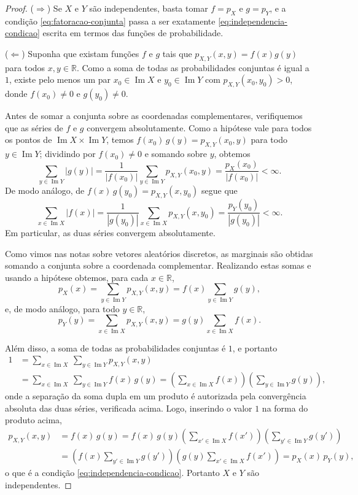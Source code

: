 \documentclass[12pt,portuguese]{article}
\theoremstyle{definition}
\begin{document}
\begin{proof}
\smallskip
\noindent($\Longrightarrow$) Se $X$ e $Y$ são independentes, basta tomar
$f = p_X$ e $g = p_Y$, e a condição \eqref{eq:fatoracao-conjunta} passa a ser
exatamente \eqref{eq:independencia-condicao} escrita em termos das funções de
probabilidade.

\smallskip
\noindent($\Longleftarrow$) Suponha que existam funções $f$ e $g$ tais
que $p_{X,Y}(x,y) = f(x)g(y)$ para todos $x, y \in \mathbb{R}$. Como a soma de
todas as probabilidades conjuntas é igual a $1$, existe pelo menos um par
$x_0 \in \operatorname{Im}X$ e $y_0 \in \operatorname{Im}Y$ com
$p_{X,Y}(x_0,y_0) > 0$, donde $f(x_0) \neq 0$ e $g(y_0) \neq 0$.

Antes de somar a conjunta sobre as coordenadas complementares, verifiquemos
que as séries de $f$ e $g$ convergem absolutamente. Como a hipótese vale para
todos os pontos de $\operatorname{Im}X \times \operatorname{Im}Y$, temos
$f(x_0)\,g(y) = p_{X,Y}(x_0,y)$ para todo $y \in \operatorname{Im}Y$; dividindo
por $f(x_0) \neq 0$ e somando sobre $y$, obtemos
\[
\sum_{y\in\operatorname{Im}Y} |g(y)|
= \frac{1}{|f(x_0)|} \sum_{y\in\operatorname{Im}Y} p_{X,Y}(x_0,y)
= \frac{p_X(x_0)}{|f(x_0)|} < \infty.
\]
De modo análogo, de $f(x)\,g(y_0) = p_{X,Y}(x,y_0)$ segue que
\[
\sum_{x\in\operatorname{Im}X} |f(x)|
= \frac{1}{|g(y_0)|} \sum_{x\in\operatorname{Im}X} p_{X,Y}(x,y_0)
= \frac{p_Y(y_0)}{|g(y_0)|} < \infty.
\]
Em particular, as duas séries convergem absolutamente.

Como vimos nas notas sobre vetores aleatórios discretos, as marginais são
obtidas somando a conjunta sobre a coordenada complementar. Realizando estas
somas e usando a hipótese obtemos, para cada $x\in\mathbb{R}$,
\[
p_X(x) = \sum_{y\in\operatorname{Im}Y} p_{X,Y}(x,y) = f(x)\sum_{y\in\operatorname{Im}Y} g(y),
\]
e, de modo análogo, para todo $y\in\mathbb{R}$,
\[
p_Y(y) = \sum_{x\in\operatorname{Im}X} p_{X,Y}(x,y) = g(y)\sum_{x\in\operatorname{Im}X} f(x).
\]

Além disso, a soma de todas as probabilidades conjuntas é $1$, e portanto
\begin{align*}
1 &= \sum_{x\in\operatorname{Im}X}\ \sum_{y\in\operatorname{Im}Y} p_{X,Y}(x,y)
\\[0.3cm]
&= \sum_{x\in\operatorname{Im}X}\ \sum_{y\in\operatorname{Im}Y} f(x)\,g(y)
= \left(\sum_{x\in\operatorname{Im}X} f(x)\right)\left(\sum_{y\in\operatorname{Im}Y} g(y)\right),
\end{align*}
onde a separação da soma dupla em um produto é autorizada pela convergência
absoluta das duas séries, verificada acima.
Logo, inserindo o valor $1$ na forma do produto acima,
\begin{align*}
p_{X,Y}(x, y) &= f(x)\,g(y)
= f(x)\,g(y)\left(\sum_{x'\in\operatorname{Im}X} f(x')\right)
\left(\sum_{y'\in\operatorname{Im}Y} g(y')\right)
\\[0.3cm]
&= \left(f(x)\sum_{y'\in\operatorname{Im}Y} g(y')\right)
\left(g(y)\sum_{x'\in\operatorname{Im}X} f(x')\right)
= p_X(x)\,p_Y(y),
\end{align*}
o que é a condição \eqref{eq:independencia-condicao}. Portanto $X$ e $Y$ são
independentes.
\end{proof}
\end{document}
